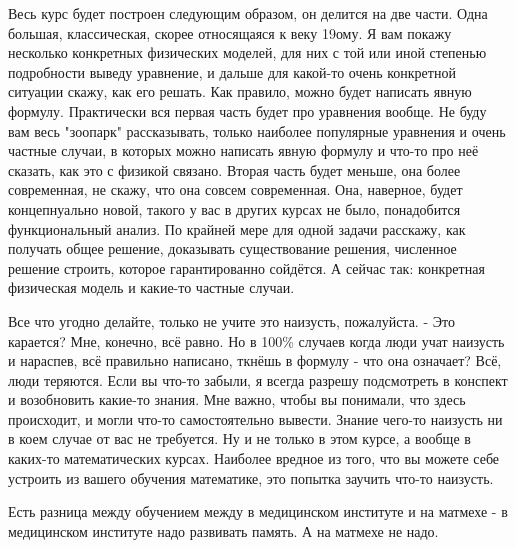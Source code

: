 Весь курс будет построен следующим образом, он делится на две части. Одна большая, классическая, скорее относящаяся к веку 19ому. Я вам покажу несколько конкретных физических моделей, для них с той или иной степенью подробности выведу уравнение, и дальше для какой-то очень конкретной ситуации скажу, как его решать. Как правило, можно будет написать явную формулу. Практически вся первая часть будет про уравнения вообще. Не буду вам весь "зоопарк" рассказывать, только наиболее популярные уравнения и очень частные случаи, в которых можно написать явную формулу и что-то про неё сказать, как это с физикой связано.
Вторая часть будет меньше, она более современная, не скажу, что она совсем современная. Она, наверное, будет концепнуально новой, такого у вас в других курсах не было, понадобится функциональный анализ. По крайней мере для одной задачи расскажу, как получать общее решение, доказывать существование решения, численное решение строить, которое гарантированно сойдётся.
А сейчас так: конкретная физическая модель и какие-то частные случаи.

Все что угодно делайте, только не учите это наизусть, пожалуйста.
- Это карается?
Мне, конечно, всё равно. Но в 100\% случаев когда люди учат наизусть и нараспев, всё правильно написано, ткнёшь в формулу - что она означает? Всё, люди теряются. Если вы что-то забыли, я всегда разрешу подсмотреть в конспект и  возобновить какие-то знания. Мне важно, чтобы вы понимали, что здесь происходит, и могли что-то самостоятельно вывести. Знание чего-то наизусть ни в коем случае от вас не требуется. Ну и не только в этом курсе, а вообще в каких-то математических курсах. Наиболее вредное из того, что вы можете себе устроить из вашего обучения математике, это попытка заучить что-то наизусть.

Есть разница между обучением между в медицинском институте и на матмехе - в медицинском институте надо развивать память. А на матмехе не надо.


\chapter{}
